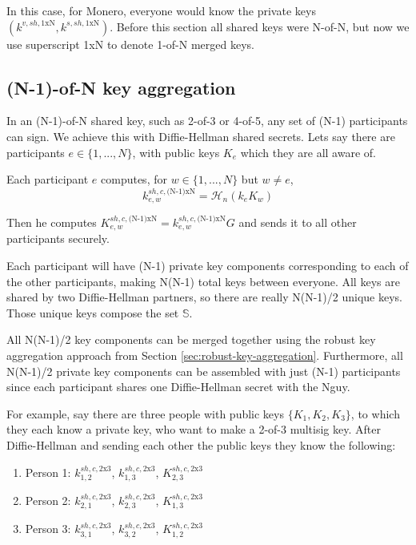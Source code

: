 In this case, for Monero, everyone would know the private keys $(k^{v,sh,{1\textrm{xN}}},k^{s,sh,{1\textrm{xN}}})$. Before this section all shared keys were N-of-N, but now we use superscript 1xN to denote 1-of-N merged keys.


\subsection{(N-1)-of-N key aggregation}
\label{sec:n-1-of-n}

In an (N-1)-of-N shared key, such as 2-of-3 or 4-of-5, any set of (N-1) participants can sign. We achieve this with Diffie-Hellman shared secrets. Lets say there are participants $e \in \{1,...,N\}$, with public keys $K_e$ which they are all aware of.

Each participant $e$ computes, for $w \in \{1,...,N\}$ but $w \neq e$,
\[ k^{sh,c,\textrm{(N-1)xN}}_{e,w} = \mathcal{H}_n(k_e K_w) \]

Then he computes $K^{sh,c,\textrm{(N-1)xN}}_{e,w} = k^{sh,c,\textrm{(N-1)xN}}_{e,w} G$ and sends it to all other participants securely.

Each participant will have (N-1) private key components corresponding to each of the other participants, making N(N-1) total keys between everyone. All keys are shared by two Diffie-Hellman partners, so there are really N(N-1)/2 unique keys. Those unique keys compose the set $\mathbb{S}$.

All N(N-1)/2 key components can be merged together using the robust key aggregation approach from Section \ref{sec:robust-key-aggregation}. Furthermore, all N(N-1)/2 private key components can be assembled with just (N-1) participants since each participant shares one Diffie-Hellman secret with the N\nth guy.

For example, say there are three people with public keys $\{K_1,K_2,K_3\}$, to which they each know a private key, who want to make a 2-of-3 multisig key. After Diffie-Hellman and sending each other the public keys they know the following:
\begin{enumerate}
    \item Person 1: $k^{sh,c,\textrm{2x3}}_{1,2}$, $k^{sh,c,\textrm{2x3}}_{1,3}$, $K^{sh,c,\textrm{2x3}}_{2,3}$
    \item Person 2: $k^{sh,c,\textrm{2x3}}_{2,1}$, $k^{sh,c,\textrm{2x3}}_{2,3}$, $K^{sh,c,\textrm{2x3}}_{1,3}$
    \item Person 3: $k^{sh,c,\textrm{2x3}}_{3,1}$, $k^{sh,c,\textrm{2x3}}_{3,2}$, $K^{sh,c,\textrm{2x3}}_{1,2}$
\end{enumerate}


